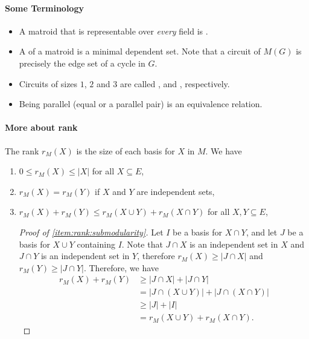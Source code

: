 \paragraph{Some Terminology}

\begin{itemize}
    \item A matroid that is representable over \emph{every} field is .
    \item A  of a matroid is a minimal dependent set.
    Note that a circuit of \(M(G)\) is precisely the edge set of a cycle in \(G\).
    \item Circuits of sizes \(1\), \(2\) and \(3\) are called ,  and , respectively.
    \item Being parallel (equal or a parallel pair) is an equivalence relation.
\end{itemize}

\paragraph{More about rank}

The rank \(r_M(X)\) is the size of each basis for \(X\) in \(M\).
We have
\begin{enumerate}[label = \textup{(R\arabic*)}]
    \item \(0 \leq r_M(X) \leq |X|\) for all \(X \subseteq E\), \label{item:rank:bounded}
    \item \(r_M(X) = r_M(Y)\) if \(X\) and \(Y\) are independent sets, \label{item:rank:subset}
    \item \(r_M(X) + r_M(Y) \leq r_M(X \cup Y) + r_M(X \cap Y)\) for all \(X, Y \subseteq E\), \label{item:rank:submodularity}
    
    \begin{proof}[Proof of \ref{item:rank:submodularity}]
        Let \(I\) be a basis for \(X \cap Y\), and let \(J\) be a basis for \(X \cup Y\) containing \(I\).
        Note that \(J \cap X\) is an independent set in \(X\) and \(J \cap Y\) is an independent set in \(Y\),
        therefore \(r_M(X) \geq |J \cap X|\) and \(r_M(Y) \geq |J \cap Y|\).
        Therefore, we have
        \begin{equation}
            \begin{aligned}
                r_M(X) + r_M(Y) &\geq |J \cap X| + |J \cap Y| \\
                &= |J \cap (X \cup Y)| + |J \cap (X \cap Y)| \\
                &\geq |J| + |I| \\
                &= r_M(X \cup Y) + r_M(X \cap Y).
            \end{aligned}
        \end{equation}
    \end{proof}
\end{enumerate}

